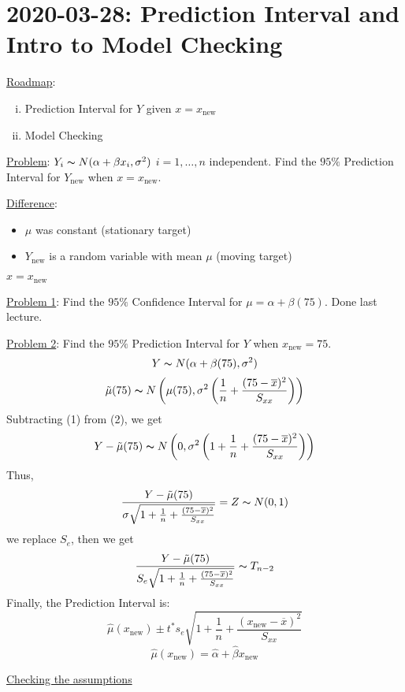 \section{2020-03-28: Prediction Interval and Intro to Model Checking}
\underline{Roadmap}:
\begin{enumerate}[(i)]
    \item Prediction Interval for $ Y $ given $ x=x_{\text{new}} $
    \item Model Checking
\end{enumerate}
\underline{Problem}: $ Y_i \thicksim N(\alpha+\beta x_i,\sigma^2) $
$ i=1,\ldots ,n $ independent. Find the $ 95\% $ Prediction Interval
for $ Y_{\text{new}} $ when $ x=x_{\text{new}} $.

\underline{Difference}:
\begin{itemize}
    \item $ \mu $ was constant (stationary target)
    \item $ Y_{\text{new}} $ is a random variable with mean $ \mu $
          (moving target)
\end{itemize}

\begin{exbox}
    \begin{example}
        $ x=x_{\text{new}} $

        \underline{Problem 1}: Find the $ 95\% $ Confidence Interval for
        $ \mu=\alpha+\beta(75) $. Done last lecture.

        \underline{Problem 2}: Find the $ 95\% $ Prediction Interval for
        $ Y $ when $ x_{\text{new}}=75 $.
        \begin{equation}
            Y \thicksim N(\alpha+\beta(75),\sigma^2)
        \end{equation}
        \begin{equation}
            \tilde{\mu}(75) \thicksim N
            \left(\mu(75),\sigma^2\left( \frac{1}{n} +
                \frac{(75-\overline{x})^2}{S_{xx}} \right)\right)
        \end{equation}
        Subtracting (1) from (2), we get
        \[ Y-\tilde{\mu}(75) \thicksim N\left( 0, \sigma^2\left(
                1+\frac{1}{n} + \frac{(75-\overline{x})^2}{S_{xx}} \right) \right)\]
        Thus,
        \[ \frac{Y-\tilde{\mu}(75)}
            {\sigma\sqrt{1+\frac{1}{n} + \frac{(75-\overline{x})^2}{S_{xx}}}}=
            Z \thicksim N(0,1)  \]
        we replace $ S_e $, then we get
        \[ \frac{Y-\tilde{\mu}(75)}
            {S_e\sqrt{1+\frac{1}{n} + \frac{(75-\overline{x})^2}{S_{xx}}}} \thicksim
            T_{n-2} \]
        Finally, the Prediction Interval is:
        \[ \hat{\mu}(x_{\text{new}})\pm
            t^* s_e
            \sqrt{1+\frac{1}{n} + \frac{(x_{\text{new}}-\overline{x})^2}{S_{xx}}} \]
        \[ \hat{\mu}(x_{\text{new}})=\hat{\alpha}+\hat{\beta}x_{\text{new}} \]
    \end{example}
\end{exbox}
\underline{Checking the assumptions}

